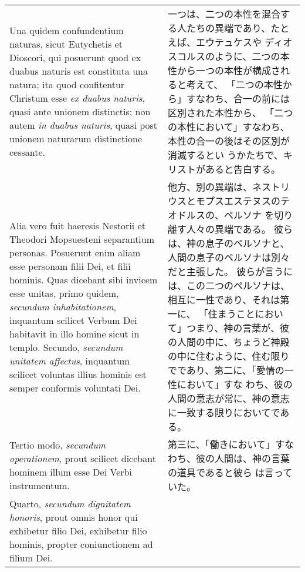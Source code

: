 \documentclass[10pt]{jsarticle} %
\begin{document}
\begin{longtable}{p{21em}p{21em}}
\\

Una quidem confundentium naturas, sicut Eutychetis
et Dioscori, qui posuerunt quod ex duabus naturis est constituta una
natura; ita quod confitentur Christum esse {\itshape ex duabus naturis}, quasi ante
unionem distinctis; non autem {\itshape in duabus naturis}, quasi post unionem
naturarum distinctione cessante. 

&

一つは、二つの本性を混合する人たちの異端であり、たとえば、エウテュケスや
 ディオスコルスのように、二つの本性から一つの本性が構成されると考えて、
 「二つの本性から」すなわち、合一の前には区別された本性から、
 「二つの本性において」すなわち、本性の合一の後はその区別が消滅するとい
 うかたちで、キリストがあると告白する。

\\

Alia vero fuit haeresis Nestorii et
Theodori Mopsuesteni separantium personas. Posuerunt enim aliam esse
personam filii Dei, et filii hominis. Quas dicebant sibi invicem esse
unitas, primo quidem, {\itshape secundum inhabitationem}, inquantum scilicet Verbum
Dei habitavit in illo homine sicut in templo. Secundo, {\itshape secundum unitatem
affectus}, inquantum scilicet voluntas illius hominis est semper
conformis voluntati Dei. 


&

他方、別の異端は、ネストリウスとモプスエステヌスのテオドルスの、ペルソナ
 を切り離す人々の異端である。
彼らは、神の息子のペルソナと、人間の息子のペルソナは別々だと主張した。
彼らが言うには、この二つのペルソナは、相互に一性であり、それは第一に、
 「住まうことにおいて」つまり、神の言葉が、彼の人間の中に、ちょうど神殿
 の中に住むように、住む限りでであり、第二に、「愛情の一性において」すな
 わち、彼の人間の意志が常に、神の意志に一致する限りにおいてである。

\\

Tertio modo, {\itshape secundum operationem}, prout
scilicet dicebant hominem illum esse Dei Verbi instrumentum. 



&


第三に、「働きにおいて」すなわち、彼の人間は、神の言葉の道具であると彼ら
 は言っていた。

\\

Quarto,
{\itshape secundum dignitatem honoris}, prout omnis honor qui exhibetur filio Dei,
exhibetur filio hominis, propter coniunctionem ad filium Dei. 


\end{longtable}
\end{document}
